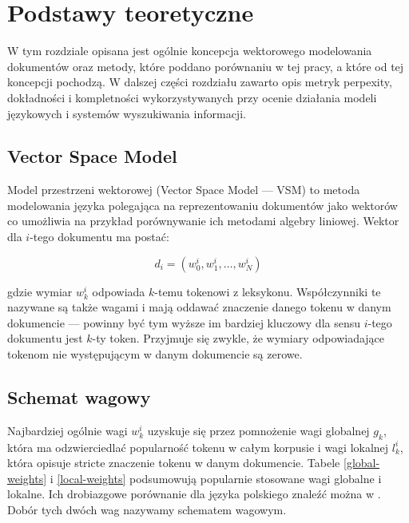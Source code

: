 \documentclass[11pt,a4paper]{article}
\begin{document}
\pagebreak

\section{Podstawy teoretyczne}
\label{sec:theory}

W tym rozdziale opisana jest ogólnie koncepcja wektorowego modelowania
dokumentów oraz metody, które poddano porównaniu w tej pracy, a które od tej
koncepcji pochodzą. W dalszej części rozdziału zawarto opis metryk perpexity,
dokładności i kompletności wykorzystywanych przy ocenie działania modeli
językowych i systemów wyszukiwania informacji.

\subsection{Vector Space Model}

Model przestrzeni wektorowej (Vector Space Model --- VSM) to metoda modelowania
języka polegająca na reprezentowaniu dokumentów jako wektorów co umożliwia na
przykład porównywanie ich metodami algebry liniowej.  Wektor dla $i$-tego
dokumentu ma postać:

\begin{equation}
d_i = (w^i_0, w^i_1, \ldots, w^i_N)
\end{equation}

gdzie wymiar $w^i_k$ odpowiada $k$-temu tokenowi z leksykonu. Współczynniki te
nazywane są także wagami i mają oddawać znaczenie danego tokenu w danym
dokumencie --- powinny być tym wyższe im bardziej kluczowy dla sensu $i$-tego
dokumentu jest $k$-ty token. Przyjmuje się zwykle, że wymiary odpowiadające
tokenom nie występującym w danym dokumencie są zerowe.

\subsection{Schemat wagowy}
\label{weighting-theory}
Najbardziej ogólnie wagi $w^i_k$ uzyskuje się przez pomnożenie wagi globalnej
$g_k$, która ma odzwierciedlać popularność tokenu w całym korpusie i wagi
lokalnej $l^i_k$, która opisuje stricte znaczenie tokenu w danym dokumencie.
Tabele \ref{global-weights} i \ref{local-weights} podsumowują popularnie
stosowane wagi globalne i lokalne. Ich drobiazgowe porównanie dla języka
polskiego znaleźć można w \cite{figiel}. Dobór tych dwóch wag nazywamy
schematem wagowym.
\end{document}
